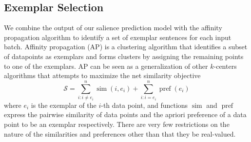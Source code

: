 %
%
%
%
%
%
%

\subsection{Exemplar Selection}
\label{sec:exsel}

We combine the output of our salience prediction model with the affinity
propagation algorithm to identify a set of exemplar sentences 
for each input batch. 
Affinity propagation (AP) is a clustering algorithm
that identifies a subset of datapoints as exemplars and forms clusters
by assigning the remaining points to one of the exemplars. AP can be seen
as a generalization of other $k$-centers algorithms that attempts to 
maximize the net similarity objective 
\[ \mathcal{S} = \sum_{i : i \neq e_i}^n \operatorname{sim}(i,e_i) 
+ \sum_{i : i = e_i}^n \operatorname{pref}(e_i)  \]
where $e_i$ is the exemplar of the $i$-th data point, and functions
$\operatorname{sim}$ and $\operatorname{pref}$ express the pairwise similarity
of data points and the apriori preference of a data point to be an exemplar
respectively. There are very 
few restrictions on the nature of the similarities and preferences
other than that they be real-valued.

